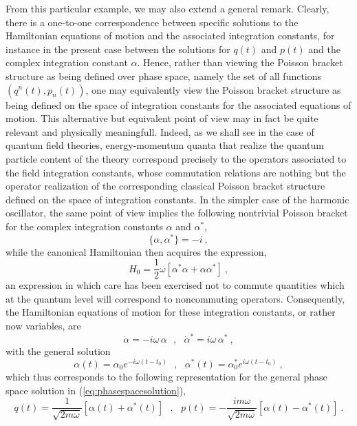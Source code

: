 \documentclass[a4paper,11pt]{article}
\begin{document}
From this particular example, we may also extend a general remark.
Clearly, there is a one-to-one correspondence between specific solutions
to the Hamiltonian equations of motion and the associated integration constants,
for instance in the present case between the solutions for $q(t)$ and $p(t)$
and the complex integration constant $\alpha$. Hence, rather than
viewing the Poisson bracket structure as being defined over phase space, 
namely the set of all functions $(q^n(t),p_n(t))$, one may equivalently view 
the Poisson bracket structure as being defined on the space of integration
constants for the associated equations of motion. This alternative but
equivalent point of view may in fact be quite relevant and physically
meaningfull. Indeed, as we shall see in the case of quantum field theories,
energy-momentum quanta that realize the quantum particle content of the
theory correspond precisely to the operators associated to the field
integration constants, whose commutation relations are nothing but the
operator realization of the corresponding classical Poisson bracket
structure defined on the space of integration constants. In the simpler
case of the harmonic oscillator, the same point of view implies the
following nontrivial Poisson bracket for the complex integration constants
$\alpha$ and $\alpha^*$,
\begin{equation}
\{\alpha,\alpha^*\}=-i\ ,
\end{equation}
while the canonical Hamiltonian then acquires the expression,
\begin{equation}
H_0=\frac{1}{2}\omega\left[\alpha^*\alpha+\alpha\alpha^*\right]\ ,
\end{equation}
an expression in which care has been exercised not to commute quantities
which at the quantum level will correspond to noncommuting operators.
Consequently, the Hamiltonian equations of motion for these integration
constants, or rather now variables, are
\begin{equation}
\dot{\alpha}=-i\omega\,\alpha\ \ \ ,\ \ \ 
\dot{\alpha}^*=i\omega\,\alpha^*\ ,
\end{equation}
with the general solution
\begin{equation}
\alpha(t)=\alpha_0e^{-i\omega(t-t_0)}\ \ \ ,\ \ \ 
\alpha^*(t)=\alpha_0^*e^{i\omega(t-t_0)}\ ,
\end{equation}
which thus corresponds to the following representation for the
general phase space solution in (\ref{eq:phasespacesolution}),
\begin{equation}
q(t)=\frac{1}{\sqrt{2m\omega}}\left[\alpha(t)+\alpha^*(t)\right]\ \ \ ,\ \ \ 
p(t)=-\frac{im\omega}{\sqrt{2m\omega}}\left[\alpha(t)-\alpha^*(t)\right]\ .
\label{eq:phasespacesolution2}
\end{equation}
\end{document}

